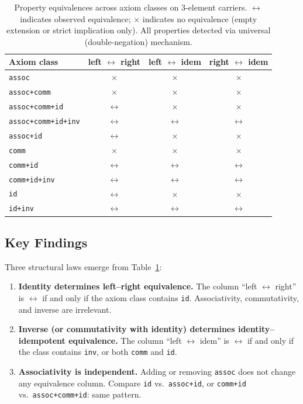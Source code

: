 \begin{table}[h]
\centering
\caption{Property equivalences across axiom classes on 3-element carriers. $\leftrightarrow$ indicates observed equivalence; $\times$ indicates no equivalence (empty extension or strict implication only). All properties detected via universal (double-negation) mechanism.}
\label{tab:property-table}
\begin{tabular}{lccc}
\toprule
Axiom class & left $\leftrightarrow$ right & left $\leftrightarrow$ idem & right $\leftrightarrow$ idem \\
\midrule
\texttt{assoc}             & $\times$ & $\times$ & $\times$ \\
\texttt{assoc+comm}        & $\times$ & $\times$ & $\times$ \\
\texttt{assoc+comm+id}     & $\leftrightarrow$ & $\times$ & $\times$ \\
\texttt{assoc+comm+id+inv} & $\leftrightarrow$ & $\leftrightarrow$ & $\leftrightarrow$ \\
\texttt{assoc+id}          & $\leftrightarrow$ & $\times$ & $\times$ \\
\texttt{comm}              & $\times$ & $\times$ & $\times$ \\
\texttt{comm+id}           & $\leftrightarrow$ & $\leftrightarrow$ & $\leftrightarrow$ \\
\texttt{comm+id+inv}       & $\leftrightarrow$ & $\leftrightarrow$ & $\leftrightarrow$ \\
\texttt{id}                & $\leftrightarrow$ & $\times$ & $\times$ \\
\texttt{id+inv}            & $\leftrightarrow$ & $\leftrightarrow$ & $\leftrightarrow$ \\
\bottomrule
\end{tabular}
\end{table}

\subsection{Key Findings}

Three structural laws emerge from Table~\ref{tab:property-table}:

\begin{enumerate}
\item \textbf{Identity determines left--right equivalence.} The column ``left $\leftrightarrow$ right'' is $\leftrightarrow$ if and only if the axiom class contains \texttt{id}. Associativity, commutativity, and inverse are irrelevant.

\item \textbf{Inverse (or commutativity with identity) determines identity--idempotent equivalence.} The column ``left $\leftrightarrow$ idem'' is $\leftrightarrow$ if and only if the class contains \texttt{inv}, or both \texttt{comm} and \texttt{id}.

\item \textbf{Associativity is independent.} Adding or removing \texttt{assoc} does not change any equivalence column. Compare \texttt{id} vs.\ \texttt{assoc+id}, or \texttt{comm+id} vs.\ \texttt{assoc+comm+id}: same pattern.
\end{enumerate}

